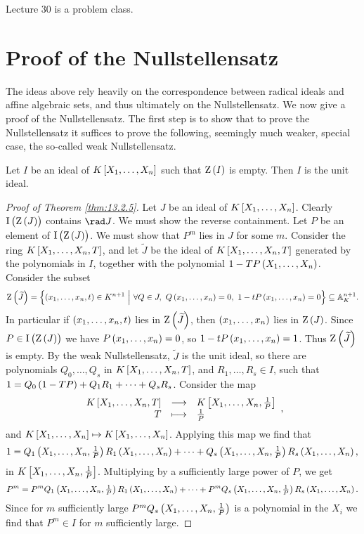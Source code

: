 
Lecture 30 is a problem class.

\pagebreak

\appendix

\section{Proof of the Nullstellensatz}

The ideas above rely heavily on the correspondence between radical ideals and affine algebraic sets, and thus ultimately on the Nullstellensatz. We now give a proof of the Nullstellensatz. The first step is to show that to prove the Nullstellensatz it suffices to prove the following, seemingly much weaker, special case, the so-called weak Nullstellensatz.

\begin{theorem}
\label{thm:13.3.1}
Let $ I $ be an ideal of $ K\sbr{X_1, \dots, X_n} $ such that $ \Z\br{I} $ is empty. Then $ I $ is the unit ideal.
\end{theorem}

\begin{proof}[Proof of Theorem \ref{thm:13.2.5}]
Let $ J $ be an ideal of $ K\sbr{X_1, \dots, X_n} $. Clearly $ \I\br{\Z\br{J}} $ contains $ \rad J $. We must show the reverse containment. Let $ P $ be an element of $ \I\br{\Z\br{J}} $. We must show that $ P^m $ lies in $ J $ for some $ m $. Consider the ring $ K\sbr{X_1, \dots, X_n, T} $, and let $ \widetilde{J} $ be the ideal of $ K\sbr{X_1, \dots, X_n, T} $ generated by the polynomials in $ I $, together with the polynomial $ 1 - TP\br{X_1, \dots, X_n} $. Consider the subset
$$ \Z\br{\widetilde{J}} = \cbr{\br{x_1, \dots, x_n, t} \in K^{n + 1} \st \forall Q \in J, \ Q\br{x_1, \dots, x_n} = 0, \ 1 - tP\br{x_1, \dots, x_n} = 0} \subseteq \AA_K^{n + 1}. $$
In particular if $ \br{x_1, \dots, x_n, t} $ lies in $ \Z\br{\widetilde{J}} $, then $ \br{x_1, \dots, x_n} $ lies in $ \Z\br{J} $. Since $ P \in \I\br{\Z\br{J}} $ we have $ P\br{x_1, \dots, x_n} = 0 $, so $ 1 - tP\br{x_1, \dots, x_n} = 1 $. Thus $ \Z\br{\widetilde{J}} $ is empty. By the weak Nullstellensatz, $ \widetilde{J} $ is the unit ideal, so there are polynomials $ Q_0, \dots, Q_s $ in $ K\sbr{X_1, \dots, X_n, T} $, and $ R_1, \dots, R_s \in I $, such that $ 1 = Q_0\br{1 - TP} + Q_1R_1 + \dots + Q_sR_s $. Consider the map
$$ \function{K\sbr{X_1, \dots, X_n, T}}{K\sbr{X_1, \dots, X_n, \tfrac{1}{P}}}{T}{\tfrac{1}{P}}, $$
and $ K\sbr{X_1, \dots, X_n} \mapsto K\sbr{X_1, \dots, X_n} $. Applying this map we find that
$$ 1 = Q_1\br{X_1, \dots, X_n, \tfrac{1}{P}}R_1\br{X_1, \dots, X_n} + \dots + Q_s\br{X_1, \dots, X_n, \tfrac{1}{P}}R_s\br{X_1, \dots, X_n}, $$
in $ K\sbr{X_1, \dots, X_n, \tfrac{1}{P}} $. Multiplying by a sufficiently large power of $ P $, we get
$$ P^m = P^mQ_1\br{X_1, \dots, X_n, \tfrac{1}{P}}R_1\br{X_1, \dots, X_n} + \dots + P^mQ_s\br{X_1, \dots, X_n, \tfrac{1}{P}}R_s\br{X_1, \dots, X_n}. $$
Since for $ m $ sufficiently large $ P^mQ_s\br{X_1, \dots, X_n, \tfrac{1}{P}} $ is a polynomial in the $ X_i $ we find that $ P^m \in I $ for $ m $ sufficiently large.
\end{proof}

